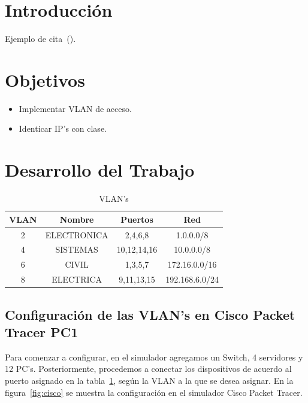 \setcounter{page}{1}


\section{Introducción}
    Ejemplo de cita~(\cite{buffett84}).
\section{Objetivos}
    \begin{itemize}
        \item Implementar VLAN de acceso.
        \item Identicar IP's con clase.
    \end{itemize}

\section{Desarrollo del Trabajo}

    \begin{table}[H]
        \begin{center}
            \begin{tabular}{ c | c | c | c }
                \textbf{VLAN} & \textbf{Nombre} & \textbf{Puertos} & \textbf{Red}\\ \hline
                2 & ELECTRONICA & 2,4,6,8 & 1.0.0.0/8\\
                4 & SISTEMAS & 10,12,14,16 & 10.0.0.0/8\\
                6 & CIVIL & 1,3,5,7 & 172.16.0.0/16\\
                8 & ELECTRICA & 9,11,13,15 & 192.168.6.0/24\\
            \end{tabular}
            \caption{VLAN's}
            \label{tab:VLANs}
            \end{center}
    \end{table}

    \subsection{Configuración de las VLAN's en Cisco Packet Tracer PC1}
        Para comenzar a configurar, en el simulador agregamos un Switch, 4 servidores y 12 PC's. Posteriormente, procedemos a conectar los dispositivos de acuerdo al puerto asignado en la tabla~\ref{tab:VLANs}, según la VLAN a la que se desea asignar. En la figura~\ref{fig:cisco} se muestra la configuración en el simulador Cisco Packet Tracer.

